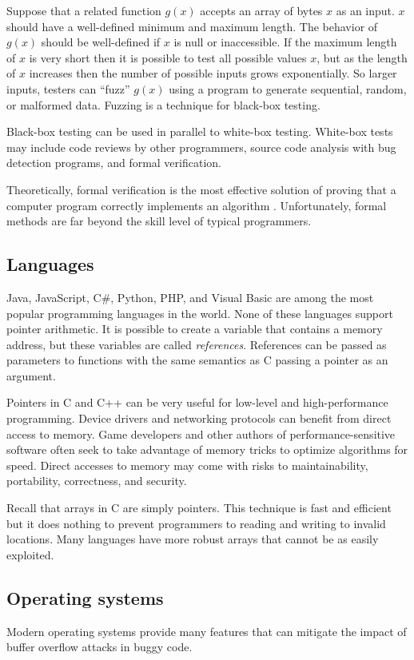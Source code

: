 \documentclass{book}
\begin{document}
Suppose that a related function $g(x)$ accepts an array of bytes $x$ as an input. $x$ should have a well-defined minimum and maximum length. The behavior of $g(x)$ should be well-defined if $x$ is null or inaccessible. If the maximum length of $x$ is very short then it is possible to test all possible values $x$, but as the length of $x$ increases then the number of possible inputs grows exponentially. So larger inputs, testers can ``fuzz'' $g(x)$ using a program to generate sequential, random, or malformed data. Fuzzing is a technique for black-box testing.

Black-box testing can be used in parallel to white-box testing. White-box tests may include code reviews by other programmers, source code analysis with bug detection programs, and formal verification.

Theoretically, formal verification is the most effective solution of proving that a computer program correctly implements an algorithm \cite{hartnett_quanta}. Unfortunately, formal methods are far beyond the skill level of typical programmers.

\subsection{Languages}
Java, JavaScript, C\#, Python, PHP, and Visual Basic are among the most popular programming languages in the world. None of these languages support pointer arithmetic. It is possible to create a variable that contains a memory address, but these variables are called \textit{references}. References can be passed as parameters to functions with the same semantics as C passing a pointer as an argument.

Pointers in C and C++ can be very useful for low-level and high-performance programming. Device drivers and networking protocols can benefit from direct access to memory. Game developers and other authors of performance-sensitive software often seek to take advantage of memory tricks to optimize algorithms for speed. Direct accesses to memory may come with risks to maintainability, portability, correctness, and security.

Recall that arrays in C are simply pointers. This technique is fast and efficient but it does nothing to prevent programmers to reading and writing to invalid locations. Many languages have more robust arrays that cannot be as easily exploited.

\subsection{Operating systems}
Modern operating systems provide many features that can mitigate the impact of buffer overflow attacks in buggy code.
\end{document}
